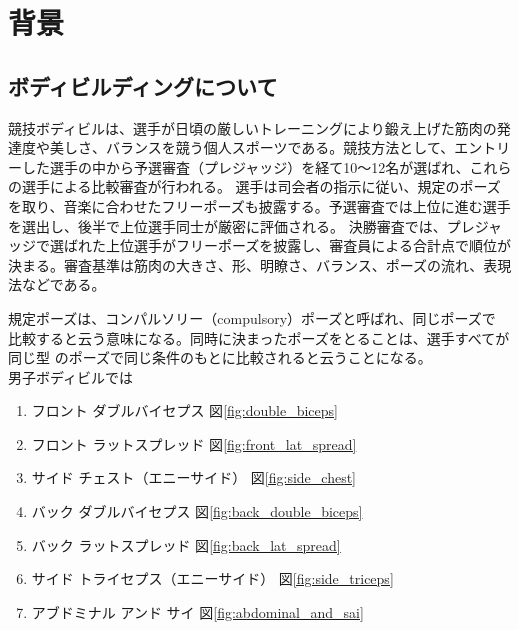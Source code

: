 \chapter{背景}
\label{background}
\section{ボディビルディングについて}

競技ボディビルは、選手が日頃の厳しいトレーニングにより鍛え上げた筋肉の発達度や美しさ、バランスを競う個人スポーツである。競技方法として、エントリーした選手の中から予選審査（プレジャッジ）を経て10～12名が選ばれ、これらの選手による比較審査が行われる。
選手は司会者の指示に従い、規定のポーズを取り、音楽に合わせたフリーポーズも披露する。予選審査では上位に進む選手を選出し、後半で上位選手同士が厳密に評価される。
決勝審査では、プレジャッジで選ばれた上位選手がフリーポーズを披露し、審査員による合計点で順位が決まる。\cite{bodybuilding}審査基準は筋肉の大きさ、形、明瞭さ、バランス、ポーズの流れ、表現法などである。

規定ポーズは、コンパルソリー（compulsory）ポーズと呼ばれ、同じポーズで
比較すると云う意味になる。同時に決まったポーズをとることは、選手すべてが同じ型
のポーズで同じ条件のもとに比較されると云うことになる。\cite{posing_performance_jbbf} \\
男子ボディビルでは
\begin{enumerate}
    \item フロント ダブルバイセプス 図\ref{fig:double_biceps}
    \item フロント ラットスプレッド 図\ref{fig:front_lat_spread}
    \item サイド チェスト（エニーサイド） 図\ref{fig:side_chest}
    \item バック ダブルバイセプス 図\ref{fig:back_double_biceps}
    \item バック ラットスプレッド 図\ref{fig:back_lat_spread}
    \item サイド トライセプス（エニーサイド） 図\ref{fig:side_triceps}
    \item アブドミナル アンド サイ 図\ref{fig:abdominal_and_sai}
\end{enumerate}


